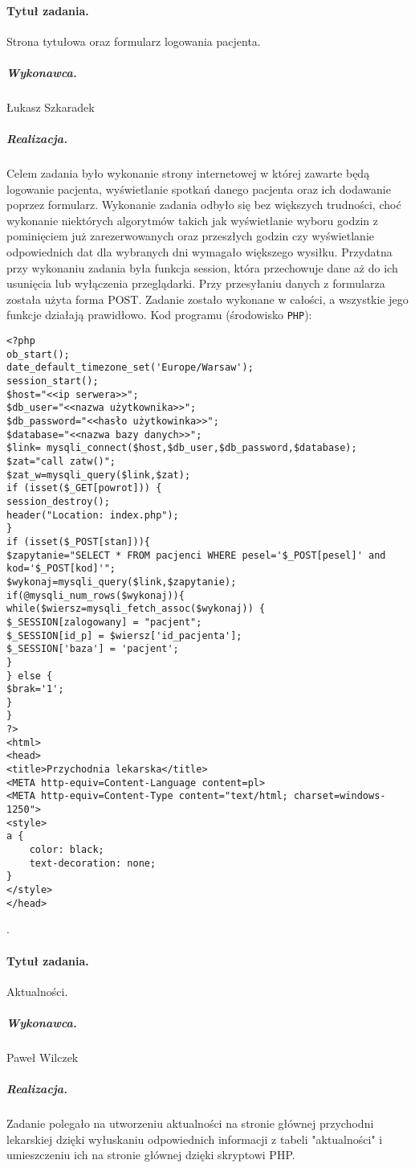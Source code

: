 \documentclass[a4paper]{article} \usepackage{polski} \usepackage[cp1250]{inputenc} \usepackage{url}
\begin{document}
\paragraph{Tytuł zadania.}  Strona tytułowa oraz formularz logowania pacjenta. \subparagraph{Wykonawca.} Łukasz Szkaradek \subparagraph{Realizacja.} Celem zadania było wykonanie strony internetowej w której zawarte będą logowanie pacjenta, wyświetlanie spotkań danego pacjenta oraz ich dodawanie poprzez formularz. Wykonanie zadania odbyło się bez większych trudności, choć wykonanie niektórych algorytmów takich jak wyświetlanie wyboru godzin z pominięciem już zarezerwowanych oraz przeszłych godzin czy wyświetlanie odpowiednich dat dla wybranych dni wymagało większego wysiłku. Przydatna przy wykonaniu zadania była funkcja session, która przechowuje dane aż do ich usunięcia lub wyłączenia przeglądarki. Przy przesyłaniu danych z formularza została użyta forma POST. Zadanie zostało wykonane w całości, a wszystkie jego funkcje działają prawidłowo.
\newline
\newline
Kod programu (środowisko \texttt{PHP}): \begin{verbatim} 
<?php
ob_start();
date_default_timezone_set('Europe/Warsaw');
session_start();
$host="<<ip serwera>>";
$db_user="<<nazwa użytkownika>>";
$db_password="<<hasło użytkowinka>>";
$database="<<nazwa bazy danych>>";
$link= mysqli_connect($host,$db_user,$db_password,$database);
$zat="call zatw()";
$zat_w=mysqli_query($link,$zat);
if (isset($_GET[powrot])) {
session_destroy();
header("Location: index.php");
}
if (isset($_POST[stan])){
$zapytanie="SELECT * FROM pacjenci WHERE pesel='$_POST[pesel]' and kod='$_POST[kod]'";
$wykonaj=mysqli_query($link,$zapytanie);
if(@mysqli_num_rows($wykonaj)){
while($wiersz=mysqli_fetch_assoc($wykonaj)) {
$_SESSION[zalogowany] = "pacjent";
$_SESSION[id_p] = $wiersz['id_pacjenta'];
$_SESSION['baza'] = 'pacjent';
}
} else {
$brak='1';
}
}
?>
<html>
<head>
<title>Przychodnia lekarska</title>
<META http-equiv=Content-Language content=pl>
<META http-equiv=Content-Type content="text/html; charset=windows-1250">
<style>
a {
    color: black;
    text-decoration: none;
}
</style>
</head>
\end{verbatim}.


\paragraph{Tytuł zadania.} Aktualności. \subparagraph{Wykonawca.} Paweł Wilczek \subparagraph{Realizacja.} Zadanie polegało na utworzeniu aktualności na stronie głównej przychodni lekarskiej dzięki wyłuskaniu odpowiednich informacji z tabeli "aktualności" i umieszczeniu ich na stronie głównej dzięki skryptowi PHP. 
\end{document}
